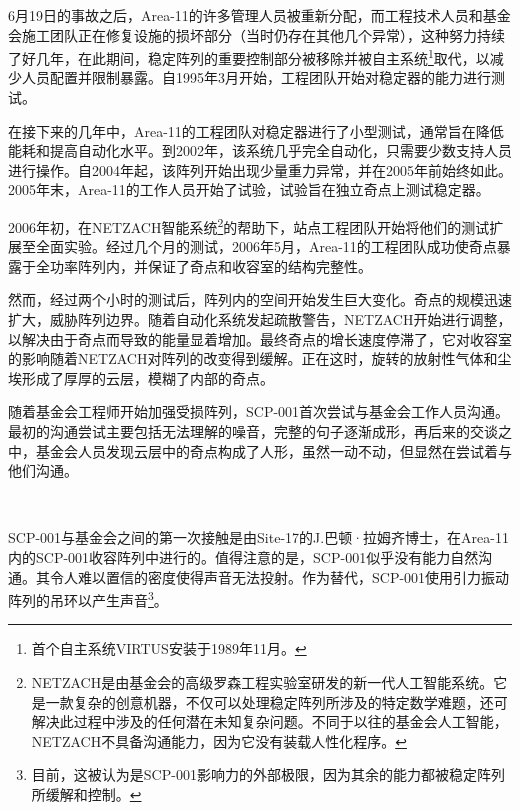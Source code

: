6月19日的事故之后，Area-11的许多管理人员被重新分配，而工程技术人员和基金会施工团队正在修复设施的损坏部分（当时仍存在其他几个异常），这种努力持续了好几年，在此期间，稳定阵列的重要控制部分被移除并被自主系统\footnote{首个自主系统VIRTUS安装于1989年11月。}取代，以减少人员配置并限制暴露。自1995年3月开始，工程团队开始对稳定器的能力进行测试。

在接下来的几年中，Area-11的工程团队对稳定器进行了小型测试，通常旨在降低能耗和提高自动化水平。到2002年，该系统几乎完全自动化，只需要少数支持人员进行操作。自2004年起，该阵列开始出现少量重力异常，并在2005年前始终如此。2005年末，Area-11的工作人员开始了试验，试验旨在独立奇点上测试稳定器。

2006年初，在NETZACH智能系统\footnote{NETZACH是由基金会的高级罗森工程实验室研发的新一代人工智能系统。它是一款复杂的创意机器，不仅可以处理稳定阵列所涉及的特定数学难题，还可解决此过程中涉及的任何潜在未知复杂问题。不同于以往的基金会人工智能，NETZACH不具备沟通能力，因为它没有装载人性化程序。}的帮助下，站点工程团队开始将他们的测试扩展至全面实验。经过几个月的测试，2006年5月，Area-11的工程团队成功使奇点暴露于全功率阵列内，并保证了奇点和收容室的结构完整性。

然而，经过两个小时的测试后，阵列内的空间开始发生巨大变化。奇点的规模迅速扩大，威胁阵列边界。随着自动化系统发起疏散警告，NETZACH开始进行调整，以解决由于奇点而导致的能量显着增加。最终奇点的增长速度停滞了，它对收容室的影响随着NETZACH对阵列的改变得到缓解。正在这时，旋转的放射性气体和尘埃形成了厚厚的云层，模糊了内部的奇点。

随着基金会工程师开始加强受损阵列，SCP-001首次尝试与基金会工作人员沟通。最初的沟通尝试主要包括无法理解的噪音，完整的句子逐渐成形，再后来的交谈之中，基金会人员发现云层中的奇点构成了人形，虽然一动不动，但显然在尝试着与他们沟通。

\newpage

\begin{center}

\hr

\\

\hr

\end{center}

SCP-001与基金会之间的第一次接触是由Site-17的J.巴顿·拉姆齐博士，在Area-11内的SCP-001收容阵列中进行的。值得注意的是，SCP-001似乎没有能力自然沟通。其令人难以置信的密度使得声音无法投射。作为替代，SCP-001使用引力振动阵列的吊环以产生声音\footnote{目前，这被认为是SCP-001影响力的外部极限，因为其余的能力都被稳定阵列所缓解和控制。}。

